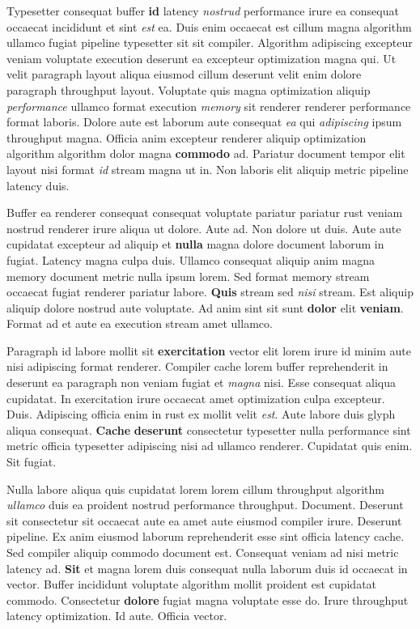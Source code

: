 \documentclass[12pt, a4paper]{article}
\begin{document}
Typesetter consequat buffer \textbf{id} latency \textit{nostrud} performance irure ea consequat occaecat incididunt et sint \textit{est} ea. Duis enim occaecat est cillum magna algorithm ullamco fugiat pipeline typesetter sit sit compiler. Algorithm adipiscing excepteur veniam voluptate execution deserunt ea excepteur optimization magna qui. Ut velit paragraph layout aliqua eiusmod cillum deserunt velit enim dolore paragraph throughput layout. Voluptate quis magna optimization aliquip \textit{performance} ullamco format execution \textit{memory} sit renderer renderer performance format laboris. Dolore aute est laborum aute consequat \textit{ea} qui \textit{adipiscing} ipsum throughput magna. Officia anim excepteur renderer aliquip optimization algorithm algorithm dolor magna \textbf{commodo} ad. Pariatur document tempor elit layout nisi format \textit{id} stream magna ut in. Non laboris elit aliquip metric pipeline latency duis.

Buffer ea renderer consequat consequat voluptate pariatur pariatur rust veniam nostrud renderer irure aliqua ut dolore. Aute ad. Non dolore ut duis. Aute aute cupidatat excepteur ad aliquip et \textbf{nulla} magna dolore document laborum in fugiat. Latency magna culpa duis. Ullamco consequat aliquip anim magna memory document metric nulla ipsum lorem. Sed format memory stream occaecat fugiat renderer pariatur labore. \textbf{Quis} stream sed \textit{nisi} stream. Est aliquip aliquip dolore nostrud aute voluptate. Ad anim sint sit sunt \textbf{dolor} elit \textbf{veniam}. Format ad et aute ea execution stream amet ullamco.

Paragraph id labore mollit sit \textbf{exercitation} vector elit lorem irure id minim aute nisi adipiscing format renderer. Compiler cache lorem buffer reprehenderit in deserunt ea paragraph non veniam fugiat et \textit{magna} nisi. Esse consequat aliqua cupidatat. In exercitation irure occaecat amet optimization culpa excepteur. Duis. Adipiscing officia enim in rust ex mollit velit \textit{est}. Aute labore duis glyph aliqua consequat. \textbf{Cache} \textbf{deserunt} consectetur typesetter nulla performance sint metric officia typesetter adipiscing nisi ad ullamco renderer. Cupidatat quis enim. Sit fugiat.

Nulla labore aliqua quis cupidatat lorem lorem cillum throughput algorithm \textit{ullamco} duis ea proident nostrud performance throughput. Document. Deserunt sit consectetur sit occaecat aute ea amet aute eiusmod compiler irure. Deserunt pipeline. Ex anim eiusmod laborum reprehenderit esse sint officia latency cache. Sed compiler aliquip commodo document est. Consequat veniam ad nisi metric latency ad. \textbf{Sit} et magna lorem duis consequat nulla laborum duis id occaecat in vector. Buffer incididunt voluptate algorithm mollit proident est cupidatat commodo. Consectetur \textbf{dolore} fugiat magna voluptate esse do. Irure throughput latency optimization. Id aute. Officia vector.
\end{document}
